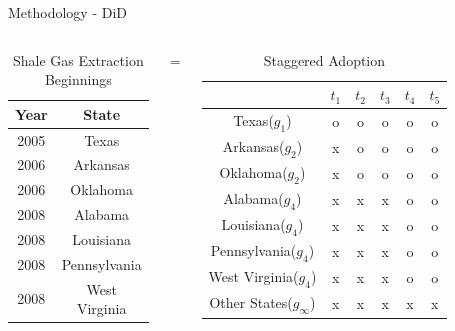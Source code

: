 \documentclass[12pt,  aspectratio=169]{beamer}    %
\begin{document}
\begin{frame}{Methodology  -  \textcite{sun_estimating_2021}  DiD}

    \begin{columns}
\begin{table}[htbp]
    \centering
    \begin{tabular}{c|  c}
        
        Year  &  State  \\
        \hline  \hline
        2005  &  Texas  \\
        2006  &  Arkansas  \\
        2006  &  Oklahoma  \\
        2008  &  Alabama  \\
        2008  &  Louisiana  \\
        2008  &  Pennsylvania  \\
        2008  &  West  Virginia  \\
    \end{tabular}
    \caption{\footnotesize  Shale  Gas  Extraction  Beginnings}
    \label{tab:shale-gas-extraction}
\end{table}
    \centering
    \Huge
    =
    \begin{table}[h]
        \centering
        \footnotesize
        \begin{tabular}{|c|c|c|c|c|c|}
        \hline
              &$t_1$&$t_2$&$t_3$&$t_4$&$t_5$  \\  \hline
              Texas($g_1$)&\textcolor{red!60}{o}&\textcolor{red!60}{o}&\textcolor{red!60}{o}&\textcolor{red!60}{o}&\textcolor{red!60}{o}  \\  \hline
              Arkansas($g_2$)&x&\textcolor{red!60}{o}&\textcolor{red!60}{o}&\textcolor{red!60}{o}&\textcolor{red!60}{o}  \\  \hline
              Oklahoma($g_2$)&x&\textcolor{red!60}{o}&\textcolor{red!60}{o}&\textcolor{red!60}{o}&\textcolor{red!60}{o}  \\  \hline
              Alabama($g_4$)&x&x&x&\textcolor{red!60}{o}&\textcolor{red!60}{o}  \\  \hline
              Louisiana($g_4$)&x&x&x&\textcolor{red!60}{o}&\textcolor{red!60}{o}  \\  \hline
              Pennsylvania($g_4$)&x&x&x&\textcolor{red!60}{o}&\textcolor{red!60}{o}  \\  \hline
              West  Virginia($g_4$)&x&x&x&\textcolor{red!60}{o}&\textcolor{red!60}{o}  \\  \hline
              Other  States($g_\infty$)&x&x&x&x&x  \\  \hline
        \end{tabular}
        \caption{\footnotesize  Staggered  Adoption}
    \end{table}
\end{columns}

\end{frame}
\end{document}

